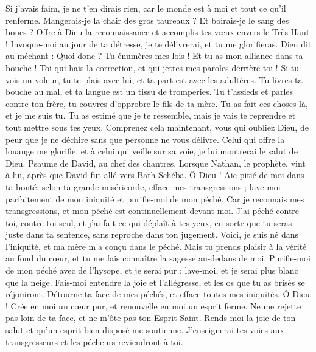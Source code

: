 \begin{multicols}{2}
Si j'avais faim, je ne t'en dirais rien, car le monde est à moi et tout ce qu'il renferme.
Mangerais-je la chair des gros taureaux ? Et boirais-je le sang des boucs ?
Offre à Dieu la reconnaissance et accomplis tes vœux envers le Très-Haut !
Invoque-moi au jour de ta détresse, je te délivrerai, et tu me glorifieras.
Dieu dit au méchant : Quoi donc ? Tu énumères mes lois ! Et tu as mon alliance dans ta bouche !
Toi qui hais la correction, et qui jettes mes paroles derrière toi !
Si tu vois un voleur, tu te plais avec lui, et ta part est avec les adultères.
Tu livres ta bouche au mal, et ta langue est un tissu de tromperies.
Tu t'assieds et parles contre ton frère, tu couvres d'opprobre le fils de ta mère.
Tu as fait ces choses-là, et je me suis tu. Tu as estimé que je te ressemble, mais je vais te reprendre et tout mettre sous tes yeux.
Comprenez cela maintenant, vous qui oubliez Dieu, de peur que je ne déchire sans que personne ne vous délivre.
Celui qui offre la louange me glorifie, et à celui qui veille sur sa voie, je lui montrerai le salut de Dieu.
\VerseOne{}Psaume de David, au chef des chantres.
Lorsque Nathan, le prophète, vint à lui, après que David fut allé vers Bath-Schéba.
Ô Dieu ! Aie pitié de moi dans ta bonté; selon ta grande miséricorde, efface mes transgressions ;
lave-moi parfaitement de mon iniquité et purifie-moi de mon péché.
Car je reconnais mes transgressions, et mon péché est continuellement devant moi.
J'ai péché contre toi, contre toi seul, et j'ai fait ce qui déplaît à tes yeux, en sorte que tu seras juste dans ta sentence, sans reproche dans ton jugement.
Voici, je suis né dans l'iniquité, et ma mère m'a conçu dans le péché.
Mais tu prends plaisir à la vérité au fond du cœur, et tu me fais connaître la sagesse au-dedans de moi.
Purifie-moi de mon péché avec de l'hysope, et je serai pur ; lave-moi, et je serai plus blanc que la neige.
Fais-moi entendre la joie et l'allégresse, et les os que tu as brisés se réjouiront.
Détourne ta face de mes péchés, et efface toutes mes iniquités.
Ô Dieu ! Crée en moi un cœur pur, et renouvelle en moi un esprit ferme.
Ne me rejette pas loin de ta face, et ne m'ôte pas ton Esprit Saint.
Rends-moi la joie de ton salut et qu'un esprit bien disposé me soutienne.
J'enseignerai tes voies aux transgresseurs et les pécheurs reviendront à toi.

\end{multicols}
